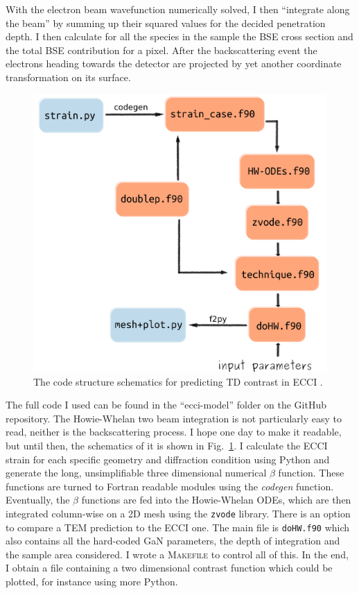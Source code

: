 With the electron beam wavefunction numerically solved, I then ``integrate along the beam'' by summing up their squared values for the decided penetration depth. I then calculate for all the species in the sample the BSE cross section and the total BSE contribution for a pixel. After the backscattering event the electrons heading towards the detector are projected by yet another coordinate transformation on its surface.

\begin{figure}[ht]
    \centering
    \includegraphics[width=0.6\linewidth]{Figures/code.png}
    \caption{ The code structure  schematics for predicting TD contrast in ECCI . }
    \label{fig:code}
\end{figure}

The full code I used can be found in  the ``ecci-model'' folder on the GitHub repository. The Howie-Whelan two beam integration is not particularly easy  to read, neither is the backscattering process. I hope one day to make it readable, but until then, the schematics of it is shown in Fig.~\ref{fig:code}. I calculate the ECCI strain for each specific geometry and diffraction condition using Python and generate the long, unsimplifiable three dimensional numerical $\beta$ function. These functions are turned to Fortran readable modules using the \textit{codegen} function. Eventually, the $\beta$ functions are fed into the Howie-Whelan ODEs, which are then integrated column-wise on a 2D mesh using the \texttt{zvode} library. There is an option to compare a TEM prediction to the ECCI one.   The main file is \texttt{doHW.f90} which also contains all the hard-coded GaN parameters, the depth of integration and the sample area considered. I wrote a \textsc{Makefile} to control all of this. In the end, I obtain a file containing a two dimensional contrast function which could be plotted, for instance using more Python. 



